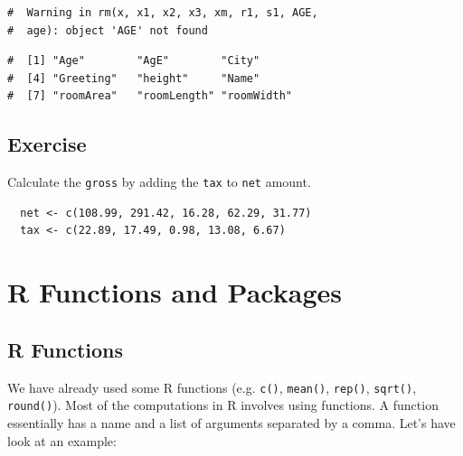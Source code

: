 \documentclass[a4paper,9pt,twocolumn,twoside,printwatermark=false]{pinp}
\begin{document}
\begin{ShadedResult}
\begin{verbatim}
#  Warning in rm(x, x1, x2, x3, xm, r1, s1, AGE,
#  age): object 'AGE' not found
\end{verbatim}
\end{ShadedResult}

\begin{Shaded}
\begin{Highlighting}[]
\NormalTok{()}
\end{Highlighting}
\end{Shaded}

\begin{ShadedResult}
\begin{verbatim}
#  [1] "Age"        "AgE"        "City"      
#  [4] "Greeting"   "height"     "Name"      
#  [7] "roomArea"   "roomLength" "roomWidth"
\end{verbatim}
\end{ShadedResult}

\subsection{Exercise}\label{exercise-2}

Calculate the \texttt{gross} by adding the \texttt{tax} to \texttt{net}
amount.

\begin{verbatim}
  net <- c(108.99, 291.42, 16.28, 62.29, 31.77)
  tax <- c(22.89, 17.49, 0.98, 13.08, 6.67)
\end{verbatim}

\section{R Functions and Packages}\label{r-functions-and-packages}

\subsection{R Functions}\label{r-functions}

We have already used some R functions (e.g. \texttt{c()},
\texttt{mean()}, \texttt{rep()}, \texttt{sqrt()}, \texttt{round()}).
Most of the computations in R involves using functions. A function
essentially has a name and a list of arguments separated by a comma.
Let's have look at an example:

\begin{Shaded}
\begin{Highlighting}[]
\NormalTok{(} \NormalTok{, } \NormalTok{, } \NormalTok{)}
\end{Highlighting}
\end{Shaded}
\end{document}
